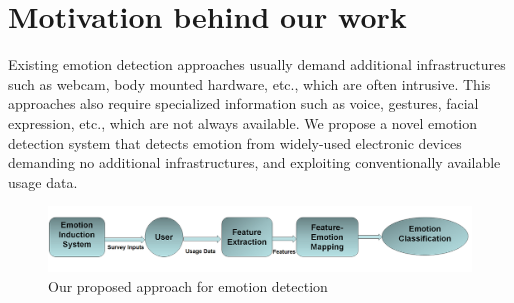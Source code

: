 \chapter{Motivation behind our work}
Existing emotion detection approaches usually demand additional infrastructures such as webcam, body mounted hardware, etc., which are often intrusive. This approaches also require specialized information such as voice, gestures, facial expression, etc., which are not always available. We propose a novel emotion detection system that detects emotion from widely-used electronic devices demanding no additional infrastructures, and exploiting conventionally available usage data.
\begin{figure}
\centering
\includegraphics[width=5.25in,clip,keepaspectratio]{Chapters/figures/workingProcedure2.png}
\caption{Our proposed approach for emotion detection}
\label{Optional }
\end{figure}

